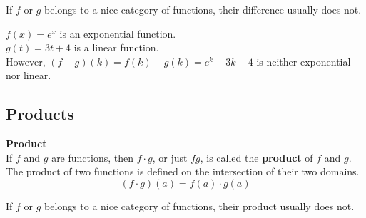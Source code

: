 \documentclass{ximera}
\begin{document}
\begin{warning}

If $f$ or $g$ belongs to a nice category of functions, their difference usually does not.

\end{warning}





\begin{example}

$f(x) = e^x$ is an exponential function. \\
$g(t) = 3 t + 4$ is a linear function. \\

However, $(f - g)(k) = f(k) - g(k) = e^k - 3 k - 4$ is neither exponential nor linear.

\end{example}
















\subsection*{Products}



\begin{template}  \textbf{\textcolor{blue!55!black}{Product}} \\


If  $f$ and $g$ are functions, then $f \cdot g$, or just $f g$, is called the \textbf{\textcolor{green!50!black}{product}} of $f$ and $g$. \\

The product of two functions is defined on the intersection of their two domains. \\


\[ (f \cdot g)(a) = f(a) \cdot g(a)  \]



\end{template}



\begin{warning}

If $f$ or $g$ belongs to a nice category of functions, their product usually does not.

\end{warning}
\end{document}
